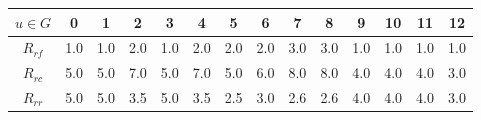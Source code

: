 	\centering
	\begin{tabular}{c|c|c|c|c|c|c|c|c|c|c|c|c|c}
		\hline
		$u \in G$ & 0 & 1 & 2 & 3 & 4 & 5 & 6 & 7 & 8 & 9 & 10 & 11 & 12\\
		\hline
		$R_{rf}$ & 1.0 & 1.0 & 2.0 & 1.0 & 2.0 & 2.0 & 2.0 & 3.0 & 3.0 & 1.0 & 1.0 & 1.0 & 1.0 \\
		$R_{rc}$ & 5.0 & 5.0 & 7.0 & 5.0 & 7.0 & 5.0 & 6.0 & 8.0 & 8.0 & 4.0 & 4.0 & 4.0 & 3.0 \\
		$R_{rr}$ & 5.0 & 5.0 & 3.5 & 5.0 & 3.5 & 2.5 & 3.0 & 2.6 & 2.6 & 4.0 & 4.0 & 4.0 & 3.0 \\
        \hline
	\end{tabular}
